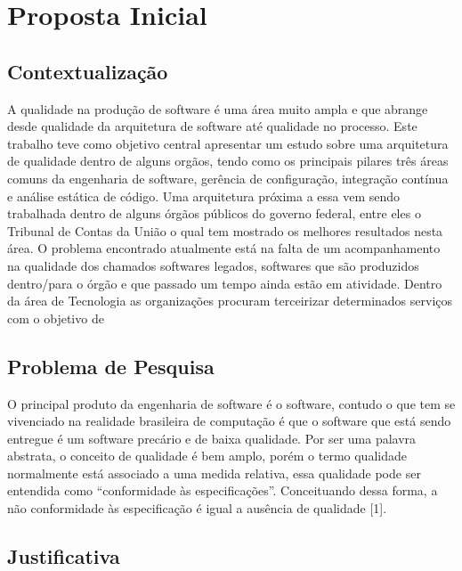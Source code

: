 
\chapter[Proposta Inicial]{Proposta Inicial}

\section{Contextualização}
	A qualidade na produção de software é uma área muito ampla e que abrange desde qualidade da arquitetura de software até qualidade no processo. Este trabalho teve como objetivo central apresentar um estudo sobre uma arquitetura de qualidade dentro de alguns orgãos, tendo como os principais pilares três áreas comuns da engenharia de software, gerência de configuração, integração contínua e análise estática de código. Uma arquitetura próxima a essa vem sendo trabalhada dentro de alguns órgãos públicos do governo federal, entre eles o Tribunal de Contas da União o qual tem mostrado os melhores resultados nesta área. O problema encontrado atualmente está na falta de um acompanhamento na qualidade dos chamados softwares legados, softwares que são produzidos dentro/para o órgão e que passado um tempo ainda estão em atividade.
	Dentro da área de Tecnologia as organizações procuram terceirizar determinados serviços com o objetivo de 
	
	
\section{Problema de Pesquisa}
	O principal produto da engenharia de software é o software, contudo o que tem se vivenciado na realidade brasileira de computação é que o software que está sendo entregue é um software precário e de baixa qualidade. Por ser uma palavra abstrata, o conceito de qualidade é bem amplo, porém o termo qualidade normalmente está associado a uma medida relativa, essa qualidade pode ser entendida como “conformidade às especificações”. Conceituando dessa forma, a não conformidade às especificação é igual a ausência de qualidade [1].
	
	
	

	
\section{Justificativa}


